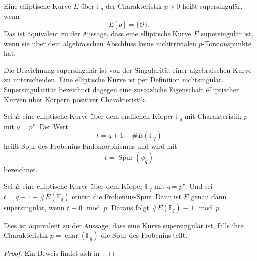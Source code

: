 \begin{definition}[Supersingularität]
    Eine elliptische Kurve $E$ über $\mathbb F_q$ der
    Charakteristik $p>0$ heißt supersingulär, wenn
    \[
        E[p]=\{\mathcal{O}\}.
    \]
    Das ist äquivalent zu der Aussage, dass eine elliptische Kurve $E$ supersingulär ist, wenn sie über dem algebraischen Abschluss keine nichttrivialen $p$-Torsionspunkte hat.
\end{definition}
Die Bezeichnung supersingulär ist von der Singularität einer algebraischen Kurve zu unterscheiden. Eine elliptische Kurve ist per Definition nichtsingulär. Supersingularität bezeichnet dagegen eine zusätzliche Eigenschaft elliptischer Kurven über Körpern positiver Charakteristik.
\begin{definition}\label{def:frobenius-spur}
    Sei $E$ eine elliptische Kurve über dem endlichen Körper $\mathbb{F}_q$ mit Charakteristik $p$ mit $q=p^r$. Der Wert
    \[
        t=q+1-\#E(\mathbb F_q)
    \]
    heißt Spur des Frobenius-Endomorphismus und wird mit
    \[
        t=\operatorname{Spur}(\phi_q)
    \]
    bezeichnet.
\end{definition}
\begin{proposition}[Spurkriterium]\label{prop:spurkriterium}
    Sei $E$ eine elliptische Kurve über dem Körper $\mathbb{F}_q$ mit $q=p^r$. Und sei $t=q+1-\#E(\mathbb{F}_q)$ erneut die Frobenius-Spur. Dann ist $E$ genau dann supersingulär, wenn \(t\equiv 0\mod p\). Daraus folgt \(\#E(\mathbb{F}_q)\equiv 1\mod p\).
\end{proposition}
Dies ist äquivalent zu der Aussage, dass eine Kurve supersingulär ist, falls ihre Charakteristik $p=\operatorname{char}(\mathbb{F}_q)$ die Spur des Frobenius teilt.
\begin{proof}
    Ein Beweis findet sich in~\cite[Proposition~4.31, S.~130--131]{washington08}.
\end{proof}
